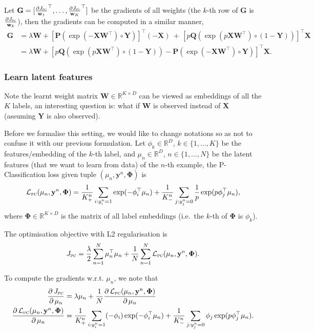 \documentclass[9pt]{extarticle}
\newcommand{\y}{\mathbf{y}}
\newcommand{\1}{\mathbf{1}}
\newcommand{\w}{\mathbf{w}}
\newcommand{\G}{\mathbf{G}}
\newcommand{\Pb}{\mathbf{P}}
\newcommand{\Q}{\mathbf{Q}}
\newcommand{\W}{\mathbf{W}}
\newcommand{\X}{\mathbf{X}}
\newcommand{\Y}{\mathbf{Y}}
\newcommand{\R}{\mathbb{R}}
\newcommand{\LCal}{\mathcal{L}}
\newcommand{\Phibm}{\mathbf{\Phi}}
\newcommand{\ie}{i.e.\ }
\begin{document}
Let $\G=[\frac{\partial J_\textsc{pc}}{\w_1}^\top,\dots,\frac{\partial J_\textsc{pc}}{\w_K}^\top]$ be the gradients of all weights
(the $k$-th row of $\G$ is $\frac{\partial J_\textsc{pc}}{\w_k}$),
then the gradients can be computed in a similar manner,
\begin{align*}
\G 
&= \lambda \W + 
   \left[ \Pb \left( \exp(-\X \W^\top) \circ \Y     \right) \right]^\top \! (-\X) \ + \,
   \left[ p\Q \left( \exp(p\X \W^\top) \circ (1-\Y) \right) \right]^\top \! \X \\
&= \lambda \W + \left[ p \Q \left( \exp(p \X \W^\top) \circ (1-\Y) \right) - \Pb \left( \exp(-\X \W^\top) \circ \Y \right) \right]^\top \X.
\end{align*}


\subsubsection{Learn latent features}
\label{sssec:latent}

Note the learnt weight matrix $\W \in \R^{K \times D}$ can be viewed as embeddings of all the $K$ labels,
an interesting question is: what if $\W$ is observed instead of $\X$ (assuming $\Y$ is also observed).

Before we formalise this setting, we would like to change notations so as not to confuse it with our previous formulation.
Let $\phi_k \in \R^D, \, k \in \{1,\dots,K\}$ be the features/embedding of the $k$-th label,
and $\mu_n \in \R^D, \, n \in \{1,\dots,N\}$ be the latent features (that we want to learn from data) of the $n$-th example,
the P-Classification loss given tuple $(\mu_n, \y^n, \Phibm)$ is
$$
\LCal_\textsc{pc}(\mu_n, \y^n, \Phibm) 
= \frac{1}{K_+^n} \sum_{i:y_i^n=1} \exp(-\phi_i^\top \mu_n) + \frac{1}{K_-^n} \sum_{j:y_j^n=0} \frac{1}{p} \exp(p \phi_j^\top \mu_n),
$$
where $\Phibm \in \R^{K \times D}$ is the matrix of all label embeddings (\ie the $k$-th of $\Phibm$ is $\phi_k$).

The optimisation objective with L2 regularisation is
$$
J_\textsc{pc} = \frac{\lambda}{2} \sum_{n=1}^N \mu_n^\top \mu_n + \frac{1}{N} \sum_{n=1}^N \LCal_\textsc{pc}(\mu_n, \y^n, \Phibm).
$$

To compute the gradients w.r.t. $\mu_n$, we note that
\begin{align*}
\frac{\partial \, J_\textsc{pc}} {\partial \, \mu_n} 
&= \lambda \mu_n + \frac{1}{N} \frac{\partial \, \LCal_\textsc{pc}(\mu_n, \y^n, \Phibm)} {\partial \, \mu_n} \\
%
\frac{\partial \, \LCal_\textsc{pc}(\mu_n, \y^n, \Phibm)} {\partial \, \mu_n}
&= \frac{1}{K_+^n} \sum_{i:y_i^n=1} (-\phi_i) \exp(-\phi_i^\top \mu_n) + \frac{1}{K_-^n} \sum_{j:y_j^n=0} \phi_j \exp(p \phi_j^\top \mu_n).
\end{align*}
\end{document}
